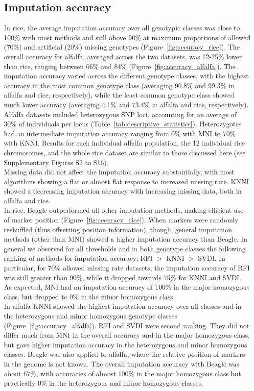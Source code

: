 \subsection{Imputation accuracy}
\label{sec:imputation_accuracy}  

In rice, the average imputation accuracy over all genotypic classes was close to 100\% with most methods and still above 90\% at maximum proportions of allowed (70\%) and artificial (20\%) missing genotypes (Figure~\ref{fig:accuracy_rice}). The overall accuracy for alfalfa, averaged across the two datasets, was 12-25\% lower than rice, ranging between 66\% and 84\% (Figure~\ref{fig:accuracy_alfalfa}). The imputation accuracy varied across the different genotype classes, with the highest accuracy in the most common genotype class (averaging 90.8\% and 99.3\% in alfalfa and rice, respectively), while the least common genotype class showed much lower accuracy (averaging 4.1\% and 73.4\% in alfalfa and rice, respectively). Alfalfa datasets included heterozygous SNP loci, accounting for an average of 30\% of individuals per locus (Table~\ref{tab:descriptive_statistics}). Heterozygotes had an intermediate imputation accuracy ranging from 0\% with MNI to 70\% with KNNI. Results for each individual alfalfa population, the 12 individual rice chromosomes, and the whole rice dataset are similar to those discussed here (see Supplementary Figures S2 to S16). \\
Missing data did not affect the imputation accuracy substantially, with most algorithms showing a flat or almost flat response to increased missing rate. KNNI showed a decreasing imputation accuracy with increasing missing data, both in alfalfa and rice.\\
In rice, Beagle outperformed all other imputation methods, making efficient use of marker position (Figure~\ref{fig:accuracy_rice}). When markers were randomly reshuffled (thus offsetting position information), though, general imputation methods (other than MNI) showed a higher imputation accuracy than Beagle. In general we observed for all thresholds and in both genotype classes the following ranking of methods for imputation accuracy: RFI $>$ KNNI $>$ SVDI.
In particular, for 70\% allowed missing rate datasets, the imputation accuracy of RFI was still greater than 90\%, while it dropped towards 75\% for KNNI and SVDI. As expected, MNI had an imputation accuracy of 100\% in the major homozygous class, but dropped to 0\% in the minor homozygous class.\\
In alfalfa KNNI showed the highest imputation accuracy over all classes and in the heterozygous and minor homozygous genotype classes (Figure~\ref{fig:accuracy_alfalfa}). RFI and SVDI were second ranking. They did not differ much from MNI in the overall accuracy and in the major homozygous class, but gave higher imputation accuracy in the heterozygous and minor homozygous classes. Beagle was also applied to alfalfa, where the relative position of markers in the genome is not known. The overall imputation accuracy with Beagle was about 67\%, with accuracies of almost 100\% in the major homozygous class but practically 0\% in the heterozygous and minor homozygous classes.

